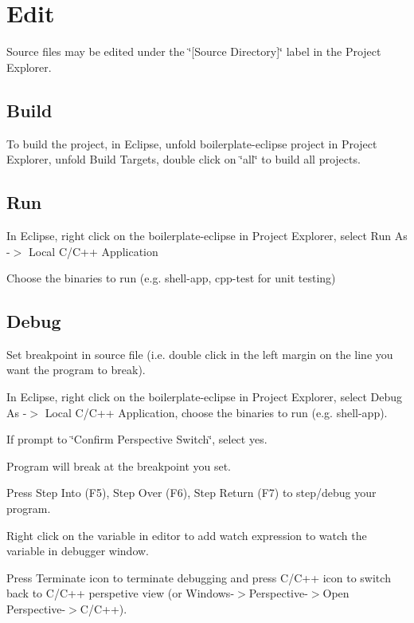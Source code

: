 \section*{Edit}

Source files may be edited under the \char`\"{}\mbox{[}\+Source Directory\mbox{]}\char`\"{} label in the Project Explorer.

\subsection*{Build}

To build the project, in Eclipse, unfold boilerplate-\/eclipse project in Project Explorer, unfold Build Targets, double click on \char`\"{}all\char`\"{} to build all projects.

\subsection*{Run}


\begin{DoxyEnumerate}
\item In Eclipse, right click on the boilerplate-\/eclipse in Project Explorer, select Run As -\/$>$ Local C/\+C++ Application
\item Choose the binaries to run (e.\+g. shell-\/app, cpp-\/test for unit testing)
\end{DoxyEnumerate}

\subsection*{Debug}


\begin{DoxyEnumerate}
\item Set breakpoint in source file (i.\+e. double click in the left margin on the line you want the program to break).
\item In Eclipse, right click on the boilerplate-\/eclipse in Project Explorer, select Debug As -\/$>$ Local C/\+C++ Application, choose the binaries to run (e.\+g. shell-\/app).
\item If prompt to \char`\"{}\+Confirm Perspective Switch\char`\"{}, select yes.
\item Program will break at the breakpoint you set.
\item Press Step Into (F5), Step Over (F6), Step Return (F7) to step/debug your program.
\item Right click on the variable in editor to add watch expression to watch the variable in debugger window.
\item Press Terminate icon to terminate debugging and press C/\+C++ icon to switch back to C/\+C++ perspetive view (or Windows-\/$>$Perspective-\/$>$Open Perspective-\/$>$C/\+C++).
\end{DoxyEnumerate}

